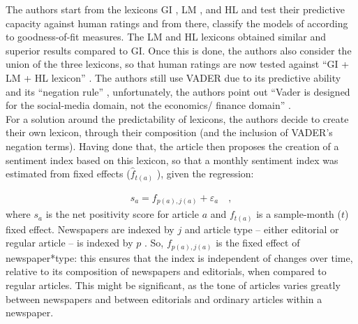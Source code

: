 The authors start from the lexicons GI \cite[]{heston2017news}, LM \cite[]{loughran2011liability}, and HL \cite[]{hu2004mining} and test their predictive capacity against human ratings and from there, classify the models of according to goodness-of-fit measures. The LM and HL lexicons obtained similar and superior results compared to GI. Once this is done, the authors also consider the union of the three lexicons, so that human ratings are now tested against ``GI + LM + HL lexicon'' \cite[p. 13]{shapiro2020measuring}. The authors still use VADER \cite[]{hutto2014vader} due to its predictive ability and its ``negation rule'' \cite[]{potts2010negativity}, unfortunately, the authors point out ``Vader is designed for the social-media domain, not the
economics/ finance domain'' \cite[p. 14]{shapiro2020measuring}.\\

For a solution around the predictability of lexicons, the authors decide to create their own lexicon, through their composition (and the inclusion of VADER's negation terms). Having done that, the article then proposes the creation of a sentiment index based on this lexicon, so that a monthly sentiment index was estimated from fixed effects ($\hat{f}_{t(a)}$ ), given the regression:

\begin{align*}
    s_a = f_{p(a), j(a)} + \varepsilon_a \quad ,
\end{align*}
where $s_a$ is the net positivity score for article $a$ and $f_{t(a)}$ is a sample-month ($t$) fixed effect. Newspapers are indexed by $j$ and article type -- either editorial or regular article -- is indexed by $p$ \cite[p. 20]{shapiro2020measuring}. So, $f_{p(a), j(a)}$ is the fixed effect of newspaper*type: this ensures that the index is independent of changes over time, relative to its composition of newspapers and editorials, when compared to regular articles. This might be significant, as the tone of articles varies greatly between newspapers and between editorials and ordinary articles within a newspaper.\\

